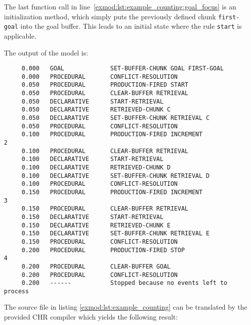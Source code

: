 The last function call in line~\ref{exmod:lst:example_counting:goal_focus} is an initialization method, which simply puts the previously defined chunk \lstinline|first-goal| into the goal buffer. This leads to an initial state where the rule \lstinline|start| is applicable.

The output of the model is:

\begin{lstlisting}
     0.000   GOAL             SET-BUFFER-CHUNK GOAL FIRST-GOAL 
     0.000   PROCEDURAL       CONFLICT-RESOLUTION 
     0.050   PROCEDURAL       PRODUCTION-FIRED START 
     0.050   PROCEDURAL       CLEAR-BUFFER RETRIEVAL 
     0.050   DECLARATIVE      START-RETRIEVAL 
     0.050   DECLARATIVE      RETRIEVED-CHUNK C 
     0.050   DECLARATIVE      SET-BUFFER-CHUNK RETRIEVAL C 
     0.050   PROCEDURAL       CONFLICT-RESOLUTION 
     0.100   PROCEDURAL       PRODUCTION-FIRED INCREMENT 
2 
     0.100   PROCEDURAL       CLEAR-BUFFER RETRIEVAL 
     0.100   DECLARATIVE      START-RETRIEVAL 
     0.100   DECLARATIVE      RETRIEVED-CHUNK D 
     0.100   DECLARATIVE      SET-BUFFER-CHUNK RETRIEVAL D 
     0.100   PROCEDURAL       CONFLICT-RESOLUTION 
     0.150   PROCEDURAL       PRODUCTION-FIRED INCREMENT 
3 
     0.150   PROCEDURAL       CLEAR-BUFFER RETRIEVAL 
     0.150   DECLARATIVE      START-RETRIEVAL 
     0.150   DECLARATIVE      RETRIEVED-CHUNK E 
     0.150   DECLARATIVE      SET-BUFFER-CHUNK RETRIEVAL E 
     0.150   PROCEDURAL       CONFLICT-RESOLUTION 
     0.200   PROCEDURAL       PRODUCTION-FIRED STOP 
4 
     0.200   PROCEDURAL       CLEAR-BUFFER GOAL 
     0.200   PROCEDURAL       CONFLICT-RESOLUTION 
     0.200   ------           Stopped because no events left to process 
\end{lstlisting}

The source file in listing \ref{exmod:lst:example_counting} can be translated by the provided CHR compiler which yields the following result:

